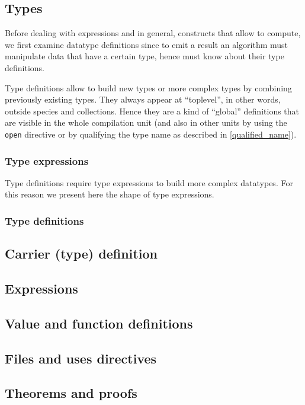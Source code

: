 \subsection{Types}
Before dealing with expressions and in general, constructs that allow
to compute, we first examine datatype definitions since to emit a
result an algorithm must manipulate data that have a certain type,
hence must know about their type definitions.

Type definitions allow to build new types or more complex types by
combining previously existing types. They always appear at
``toplevel'', in other words, outside species and collections. Hence
they are a kind of ``global'' definitions that are visible in the
whole compilation unit (and also in other units by using the
{\tt open} directive or by qualifying the type name as described in
\ref{qualified_name}).



\subsubsection{Type expressions}
Type definitions require type expressions to build more complex
datatypes. For this reason we present here the shape of type
expressions.



\subsubsection{Type definitions}


\subsection{Carrier (type) definition}

\subsection{Expressions}

\subsection{Value and function definitions}

\subsection{Files and uses directives}

\subsection{Theorems and proofs}
